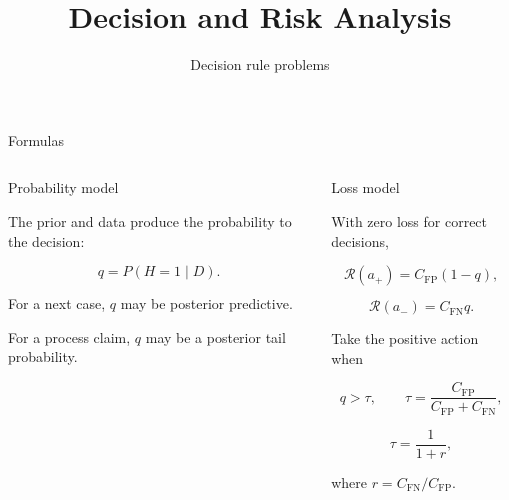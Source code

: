 \documentclass[aspectratio=43,10pt]{beamer}
\title{Decision and Risk Analysis}
\subtitle{Decision rule problems}
\author{\emph{}}
\date{
  \color{aggiemaroon}{
    DAEN 427 / ISEN 427 / ISEN 627\\
    \textbf{Alexander Abuabara}\\
    Fall 2026
  }
}
\newcommand{\CFP}{C_{\mathrm{FP}}}
\newcommand{\CFN}{C_{\mathrm{FN}}}
\newcommand{\Risk}{\mathcal{R}}
\begin{document}

\maketitle


\begin{frame}{Formulas}

  \begin{columns}[T,onlytextwidth]


    \begin{block}{Probability model}

      The prior and data produce the probability to the decision:

      \[
      q=P(H=1\mid D).
      \]

      For a next case, $q$ may be posterior predictive.

      For a process claim, $q$ may be a posterior tail probability.

    \end{block}


    \begin{block}{Loss model}

      With zero loss for correct decisions,

      \[
      \Risk(a_+)=\CFP(1-q),
      \]

      \[
      \Risk(a_-)=\CFN q.
      \]

      Take the positive action when

      \[
      q>\tau,
      \qquad
      \tau=\frac{\CFP}{\CFP+\CFN},
      \]

      \[
      \tau=\frac{1}{1+r},
      \]

      where $r=\CFN/\CFP$.

    \end{block}

  \end{columns}

\end{frame}

\end{document}
